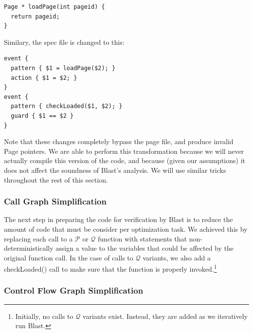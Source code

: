 \documentclass[10pt,letterpaper,twocolumn,english]{article}
\newcommand{\checkpage}{checkLoaded()\xspace}
\newcommand{\fP}{{$\mathcal P$}\xspace}
\newcommand{\fQ}{{$\mathcal Q$}\xspace}
\begin{document}
\begin{verbatim}
Page * loadPage(int pageid) {
  return pageid;
}
\end{verbatim}
Similary, the spec file is changed to this:
\begin{verbatim}
event { 
  pattern { $1 = loadPage($2); }
  action { $1 = $2; }
}
event { 
  pattern { checkLoaded($1, $2); }  
  guard { $1 == $2 }
}
\end{verbatim}

Note that these changes completely bypass the page file, and produce invalid Page pointers.
We are able to perform this transformation because we will never
actually compile this version of the code, and because (given our
assumptions) it does not affect the soundness of Blast's analysis.  We
will use similar tricks throughout the rest of this section.

\subsubsection{Call Graph Simplification}

The next step in preparing the code for verification by Blast is to
reduce the amount of code that must be consider per optimization task.
We achieved this by replacing each call to a \fP or \fQ function with
statements that non-deterministically assign a value to the variables
that could be affected by the original function call.  In the case of
calls to \fQ variants, we also add a \checkpage call to make sure that
the function is properly invoked.\footnote{Initially, no calls to \fQ
variants exist.  Instead, they are added as we iteratively run Blast.}

\subsubsection{Control Flow Graph Simplification}
\end{document}
